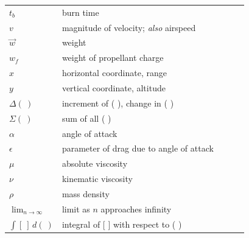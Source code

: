 \begin{longtable}{@{}l p{0.78\linewidth}@{}}
$t_b$ & burn time \\
$v$ & magnitude of velocity; \emph{also} airspeed \\
$\vec{w}$ & weight \\
$w_f$ & weight of propellant charge \\
$x$ & horizontal coordinate, range \\
$y$ & vertical coordinate, altitude \\
$\Delta(\ )$ & increment of ( ), change in ( ) \\
$\Sigma(\ )$ & sum of all ( ) \\
$\alpha$ & angle of attack \\
$\epsilon$ & parameter of drag due to angle of attack \\
$\mu$ & absolute viscosity \\
$\nu$ & kinematic viscosity \\
$\rho$ & mass density \\
$\displaystyle\lim_{n\to\infty}$ & limit as $n$ approaches infinity \\[1.2ex]
$\int [\ ]\, d(\ )$ & integral of [ ] with respect to ( ) \\
\end{longtable}
\addtocounter{table}{-1}%
